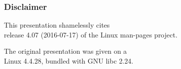 \begin{frame}

\frametitle{Disclaimer}

\vspace{\fill}

\begin{center}

This presentation shamelessly cites \\ release 4.07 (2016-07-17) of the Linux
man-pages project.

\end{center}

\begin{center}

The original presentation was given on a \\ Linux 4.4.28, bundled with GNU libc
2.24.

\end{center}

\vspace{\fill}

\end{frame}
